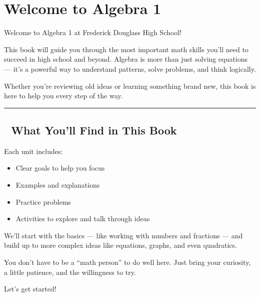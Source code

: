 \documentclass[
  letterpaper,
  DIV=11,
  numbers=noendperiod]{scrartcl}
\author{}
\date{}
\providecommand{\tightlist}{%
  \setlength{\itemsep}{0pt}\setlength{\parskip}{0pt}}
\begin{document}
\section*{Welcome to Algebra 1}\label{welcome-to-algebra-1}

Welcome to Algebra 1 at Frederick Douglass High School!

This book will guide you through the most important math skills you'll
need to succeed in high school and beyond. Algebra is more than just
solving equations --- it's a powerful way to understand patterns, solve
problems, and think logically.

Whether you're reviewing old ideas or learning something brand new, this
book is here to help you every step of the way.

\begin{center}\rule{0.5\linewidth}{0.5pt}\end{center}

\subsection{🧭 What You'll Find in This
Book}\label{what-youll-find-in-this-book}

Each unit includes:

\begin{itemize}
\tightlist
\item
  Clear goals to help you focus
\item
  Examples and explanations
\item
  Practice problems
\item
  Activities to explore and talk through ideas
\end{itemize}

We'll start with the basics --- like working with numbers and fractions
--- and build up to more complex ideas like equations, graphs, and even
quadratics.

You don't have to be a ``math person'' to do well here. Just bring your
curiosity, a little patience, and the willingness to try.

Let's get started!
\end{document}
